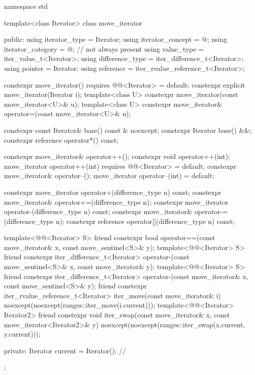 %
\begin{codeblock}
namespace std {
  template<class Iterator>
  class move_iterator {
  public:
    using iterator_type     = Iterator;
    using iterator_concept  = @\seebelow@;
    using iterator_category = @\seebelow@;                      // not always present
    using value_type        = iter_value_t<Iterator>;
    using difference_type   = iter_difference_t<Iterator>;
    using pointer           = Iterator;
    using reference         = iter_rvalue_reference_t<Iterator>;

    constexpr move_iterator() requires @@<Iterator> = default;
    constexpr explicit move_iterator(Iterator i);
    template<class U> constexpr move_iterator(const move_iterator<U>& u);
    template<class U> constexpr move_iterator& operator=(const move_iterator<U>& u);

    constexpr const Iterator& base() const & noexcept;
    constexpr Iterator base() &&;
    constexpr reference operator*() const;

    constexpr move_iterator& operator++();
    constexpr void operator++(int);
    move_iterator operator++(int) requires @@<Iterator> = default;
    constexpr move_iterator& operator--();
    move_iterator operator--(int) = default;

    constexpr move_iterator operator+(difference_type n) const;
    constexpr move_iterator& operator+=(difference_type n);
    constexpr move_iterator operator-(difference_type n) const;
    constexpr move_iterator& operator-=(difference_type n);
    constexpr reference operator[](difference_type n) const;

    template<@@<Iterator> S>
      friend constexpr bool
        operator==(const move_iterator& x, const move_sentinel<S>& y);
    template<@@<Iterator> S>
      friend constexpr iter_difference_t<Iterator>
        operator-(const move_sentinel<S>& x, const move_iterator& y);
    template<@@<Iterator> S>
      friend constexpr iter_difference_t<Iterator>
        operator-(const move_iterator& x, const move_sentinel<S>& y);
    friend constexpr iter_rvalue_reference_t<Iterator>
      iter_move(const move_iterator& i)
        noexcept(noexcept(ranges::iter_move(i.current)));
    template<@@<Iterator> Iterator2>
      friend constexpr void
        iter_swap(const move_iterator& x, const move_iterator<Iterator2>& y)
          noexcept(noexcept(ranges::iter_swap(x.current, y.current)));

  private:
    Iterator current = Iterator();      // \expos
  };
}
\end{codeblock}


